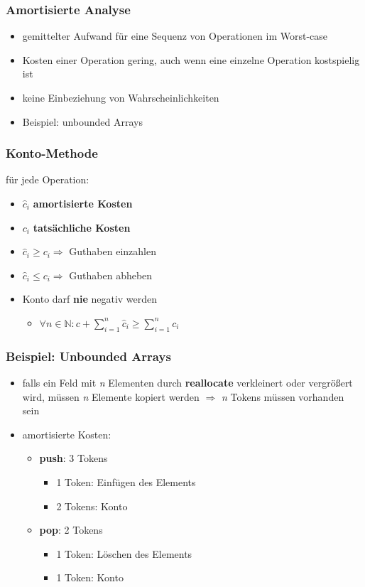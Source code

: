 \begin{frame}
	\frametitle{Amortisierte Analyse}
	\begin{itemize}
		\item gemittelter Aufwand für eine Sequenz von Operationen im Worst-case
		\item Kosten einer Operation gering, auch wenn eine einzelne Operation kostspielig ist
		\item keine Einbeziehung von Wahrscheinlichkeiten
		\item Beispiel: unbounded Arrays 
	\end{itemize}
\end{frame}

\begin{frame}
	\frametitle{Konto-Methode}
	für jede Operation:
	\begin{itemize}
		\item $\hat{c}_i$ \textbf{amortisierte Kosten}
		\item $c_i$ \textbf{tatsächliche Kosten}
		\item $\hat{c}_i \geq c_i  \Rightarrow $  Guthaben einzahlen
		\item $\hat{c}_i \leq c_i  \Rightarrow $  Guthaben abheben
		\item Konto darf \textbf{nie} negativ werden
		\begin{itemize}
			\item $ \forall n \in \mathbb{N} : c + \sum_{i=1} ^n \hat{c}_i \geq \sum_{i=1} ^n c_i$
		\end{itemize}

	\end{itemize}

\end{frame}

\begin{frame}
	\frametitle{Beispiel: Unbounded Arrays}

	\begin{itemize}
		\item falls ein Feld mit \textit{n} Elementen durch \textbf{reallocate} verkleinert oder vergrößert wird,
		 müssen \textit{n} Elemente kopiert werden $\Rightarrow$ \textit{n} Tokens müssen vorhanden sein
		\item amortisierte Kosten:
		\begin{itemize}
			\item \textbf{push}: 3 Tokens
			\begin{itemize}
				\item 1 Token: Einfügen des Elements
				\item 2 Tokens: Konto
			\end{itemize}
			\item \textbf{pop}: 2 Tokens
			\begin{itemize}
				\item 1 Token: Löschen des Elements
				\item 1 Token: Konto
			\end{itemize}
		\end{itemize}
	\end{itemize}

\end{frame}

